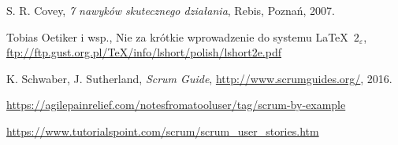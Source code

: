 \documentclass[a4paper]{article}
\begin{document}
\begin{thebibliography}{9}

 S. R. Covey, {\em 7 nawyków skutecznego działania}, Rebis, Poznań, 2007.

 Tobias Oetiker i wsp., Nie za krótkie wprowadzenie do systemu \LaTeX  \ $2_\varepsilon$, \url{ftp://ftp.gust.org.pl/TeX/info/lshort/polish/lshort2e.pdf}

 K. Schwaber, J. Sutherland, {\em Scrum Guide}, \url{http://www.scrumguides.org/}, 2016.

 \url{https://agilepainrelief.com/notesfromatooluser/tag/scrum-by-example}

 \url{https://www.tutorialspoint.com/scrum/scrum_user_stories.htm}

\end{thebibliography}
\end{document}
